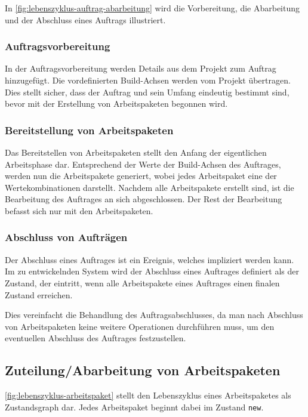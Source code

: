 In \cref{fig:lebenszyklus-auftrag-abarbeitung} wird die Vorbereitung, die Abarbeitung und der Abschluss eines Auftrags illustriert.


\subsubsection{Auftragsvorbereitung}

In der Auftragsvorbereitung werden Details aus dem Projekt zum Auftrag hinzugefügt.
Die vordefinierten Build-Achsen werden vom Projekt übertragen.
Dies stellt sicher, dass der Auftrag und sein Umfang eindeutig bestimmt sind,
bevor mit der Erstellung von Arbeitspaketen begonnen wird.


\subsubsection{Bereitstellung von Arbeitspaketen}

Das Bereitstellen von Arbeitspaketen stellt den Anfang der eigentlichen Arbeitsphase dar.
Entsprechend der Werte der Build-Achsen des Auftrages, werden nun die Arbeits\-pakete generiert,
wobei jedes Arbeitspaket eine der Wertekombinationen darstellt.
Nachdem alle Arbeitspakete erstellt sind, ist die Bearbeitung des Auftrages an sich abgeschlossen. Der Rest der Bearbeitung befasst sich nur mit den Arbeitspaketen.

\subsubsection{Abschluss von Aufträgen}

Der Abschluss eines Auftrages ist ein Ereignis, welches impliziert werden kann.
Im zu entwickelnden System wird der Abschluss eines Auftrages definiert
als der Zustand, der eintritt, wenn alle Arbeitspakete eines Auftrages
einen finalen Zustand erreichen.

Dies vereinfacht die Behandlung des Auftragsabschlusses,
da man nach Abschluss von Arbeitspaketen keine weitere Operationen durchführen muss,
um den eventuellen Abschluss des Auftrages festzustellen.

\subsection{Zuteilung/Abarbeitung von Arbeitspaketen}

\cref{fig:lebenszyklus-arbeitspaket} stellt den Lebenszyklus eines Arbeitspaketes als Zustandsgraph dar.
Jedes Arbeitspaket beginnt dabei im Zustand \verb|new|.

